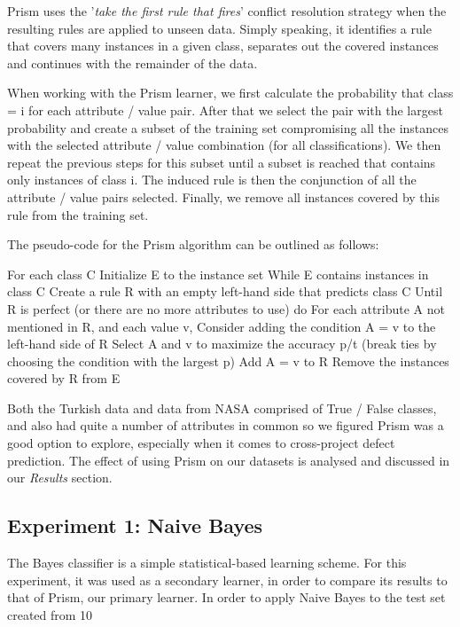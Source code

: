 \documentclass{sig-alternate}
\begin{document}
Prism uses the '{\em take the first rule that fires}' conflict resolution strategy when the resulting rules are applied to unseen data. Simply speaking, it identifies a rule that covers many instances in a given class, separates out the covered instances and continues with the remainder of the data.

When working with the Prism learner, we first calculate the probability that class = i for each attribute / value pair. After that we select the pair with the largest probability and create a subset of the training set compromising all the instances with the selected attribute / value combination (for all classifications). We then repeat the previous steps for this subset until a subset is reached that contains only instances of class i. The induced rule is then the conjunction of all the attribute / value pairs selected. Finally, we remove all instances covered by this rule from the training set.


The pseudo-code for the Prism algorithm can be outlined as follows:

For each class C
Initialize E to the instance set
While E contains instances in class C
Create a rule R with an empty left-hand side that predicts class C
Until R is perfect (or there are no more attributes to use) do
For each attribute A not mentioned in R, and each value v,
Consider adding the condition A = v to the left-hand side of R
Select A and v to maximize the accuracy p/t
(break ties by choosing the condition with the largest p)
Add A = v to R
Remove the instances covered by R from E

Both the Turkish data and data from NASA comprised of True / False classes, and also had quite a number of attributes in common so we figured Prism was a good option to explore, especially when it comes to cross-project defect prediction. The effect of using Prism on our datasets is analysed and discussed in our {\em Results} section.


\subsection{Experiment 1: Naive Bayes}
The Bayes classifier is a simple statistical-based learning scheme. For this experiment, it was used as a secondary learner, in order to compare its results to that of Prism, our primary learner. In order to apply Naive Bayes to the test set created from 10%
\end{document}
